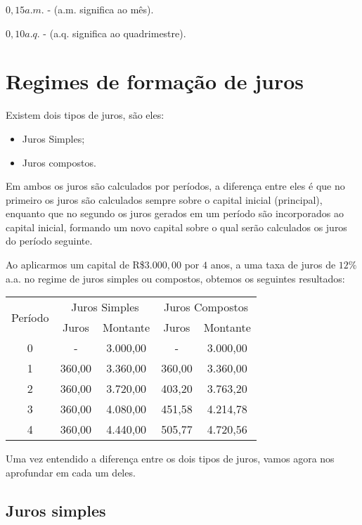  $0,15 a.m.$ - (a.m. significa ao mês).

 $0,10 a.q.$ - (a.q. significa ao quadrimestre).

 \newpage

 \section{Regimes de formação de juros}

 Existem dois tipos de juros, são eles:
 \begin{itemize}
  \item Juros Simples;
  \item Juros compostos.
 \end{itemize}
 Em ambos os juros são calculados por períodos, a diferença entre eles é que no primeiro os juros são calculados sempre sobre o capital inicial (principal), enquanto que no segundo os juros gerados em um período são incorporados ao capital inicial, formando um novo capital sobre o qual serão calculados os juros do período seguinte.

 \begin{exem}
  Ao aplicarmos um capital de R\$$3.000,00$ por $4$ anos, a uma taxa de juros de $12\%$ a.a. no regime de juros simples ou compostos, obtemos os seguintes resultados:
\begin{table}[h]
\centering
\label{my-label}
\begin{tabular}{|c|c|c|c|c|} \hline
\multirow{2}{*}{Período} & \multicolumn{2}{|c|}{Juros Simples} & \multicolumn{2}{|c|}{Juros Compostos} \\
    & Juros  & Montante & Juros  & Montante \\\hline
  0 & -      & 3.000,00 & -      & 3.000,00 \\\hline
  1 & 360,00 & 3.360,00 & 360,00 & 3.360,00 \\\hline
  2 & 360,00 & 3.720,00 & 403,20 & 3.763,20 \\\hline
  3 & 360,00 & 4.080,00 & 451,58 & 4.214,78 \\\hline
  4 & 360,00 & 4.440,00 & 505,77 & 4.720,56 \\\hline
\end{tabular}
\end{table}
 \end{exem}

 Uma vez entendido a diferença entre os dois tipos de juros, vamos agora nos aprofundar em cada um deles.

 \subsection{Juros simples}

